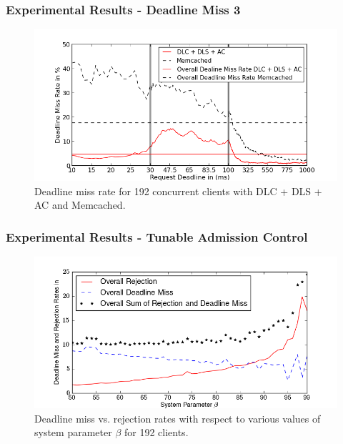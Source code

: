 \documentclass{beamer}
\begin{document}
\begin{frame}
  \frametitle{Experimental Results - Deadline Miss 3}
  \begin{figure}[t]
    \begin{center}
      \centerline{\includegraphics[scale=0.5]{img/EC2/EC2_AC_MM/miss_48.png}}
      \caption{Deadline miss rate for 192 concurrent clients with DLC + DLS + AC and Memcached.}
      \label{fig:miss_192_ac_mm}
    \end{center}
  \end{figure}
\end{frame}

\begin{frame}
  \frametitle{Experimental Results - Tunable Admission Control}
  \begin{figure}[t]
    \begin{center}
      \centerline{\includegraphics[scale=0.5]{img/EC2/Varying_ac/varying_acPerc_192.png}}
      \caption{Deadline miss vs. rejection rates with respect to various values of
        system parameter $\beta$ for 192 clients.}
      \label{fig:varying_ac}
    \end{center}
  \end{figure}
\end{frame}
\end{document}

